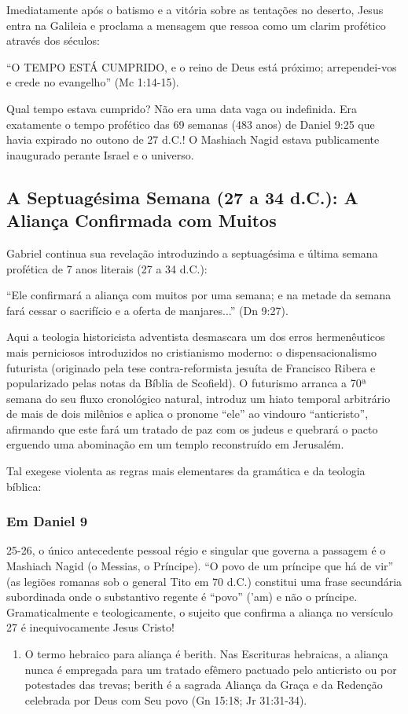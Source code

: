 Imediatamente após o batismo e a vitória sobre as tentações no deserto, Jesus entra na Galileia e proclama a mensagem que ressoa como um clarim profético através dos séculos:

``O TEMPO ESTÁ CUMPRIDO, e o reino de Deus está próximo; arrependei-vos e crede no evangelho'' (Mc 1:14-15).

Qual tempo estava cumprido? Não era uma data vaga ou indefinida. Era exatamente o tempo profético das 69 semanas (483 anos) de Daniel 9:25 que havia expirado no outono de 27 d.C.! O Mashiach Nagid estava publicamente inaugurado perante Israel e o universo.



\subsection{A Septuagésima Semana (27 a 34 d.C.): A Aliança Confirmada com Muitos}


Gabriel continua sua revelação introduzindo a septuagésima e última semana profética de 7 anos literais (27 a 34 d.C.):

``Ele confirmará a aliança com muitos por uma semana; e na metade da semana fará cessar o sacrifício e a oferta de manjares...'' (Dn 9:27).

Aqui a teologia historicista adventista desmascara um dos erros hermenêuticos mais perniciosos introduzidos no cristianismo moderno: o dispensacionalismo futurista (originado pela tese contra-reformista jesuíta de Francisco Ribera e popularizado pelas notas da Bíblia de Scofield). O futurismo arranca a 70ª semana do seu fluxo cronológico natural, introduz um hiato temporal arbitrário de mais de dois milênios e aplica o pronome ``ele'' ao vindouro ``anticristo'', afirmando que este fará um tratado de paz com os judeus e quebrará o pacto erguendo uma abominação em um templo reconstruído em Jerusalém.

Tal exegese violenta as regras mais elementares da gramática e da teologia bíblica:

\subsubsection*{Em Daniel 9}
25-26, o único antecedente pessoal régio e singular que governa a passagem é o Mashiach Nagid (o Messias, o Príncipe). ``O povo de um príncipe que há de vir'' (as legiões romanas sob o general Tito em 70 d.C.) constitui uma frase secundária subordinada onde o substantivo regente é ``povo'' ('am) e não o príncipe. Gramaticalmente e teologicamente, o sujeito que confirma a aliança no versículo 27 é inequivocamente Jesus Cristo!
\begin{enumerate}
  \item O termo hebraico para aliança é berith. Nas Escrituras hebraicas, a aliança nunca é empregada para um tratado efêmero pactuado pelo anticristo ou por potestades das trevas; berith é a sagrada Aliança da Graça e da Redenção celebrada por Deus com Seu povo (Gn 15:18; Jr 31:31-34).
\end{enumerate}

